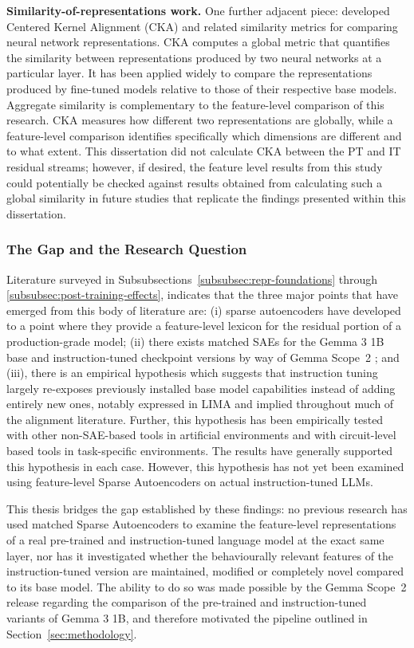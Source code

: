 \textbf{Similarity-of-representations work.} One further adjacent piece:\textcite{kornblith_similarity_2019} developed Centered Kernel Alignment (CKA) and related similarity metrics for comparing neural network representations. CKA computes a global metric that quantifies the similarity between representations produced by two neural networks at a particular layer. It has been applied widely to compare the representations produced by fine-tuned models relative to those of their respective base models. Aggregate similarity is complementary to the feature-level comparison of this research. CKA measures how different two representations are globally, while a feature-level comparison identifies specifically which dimensions are different and to what extent. This dissertation did not calculate CKA between the PT and IT residual streams; however, if desired, the feature level results from this study could potentially be checked against results obtained from calculating such a global similarity in future studies that replicate the findings presented within this dissertation.

\subsubsection{The Gap and the Research Question}
\label{subsubsec:gap-rq}

Literature surveyed in Subsubsections~\ref{subsubsec:repr-foundations} through \ref{subsubsec:post-training-effects}, indicates that the three major points that have emerged from this body of literature are: (i) sparse autoencoders have developed to a point where they provide a feature-level lexicon for the residual portion of a production-grade model; (ii) there exists matched SAEs for the Gemma 3 1B base and instruction-tuned checkpoint versions by way of Gemma Scope~2 \parencite{mcdougall_gemma_scope_2_2025}; and (iii), there is an empirical hypothesis which suggests that instruction tuning largely re-exposes previously installed base model capabilities instead of adding entirely new ones, notably expressed in LIMA and implied throughout much of the alignment literature. Further, this hypothesis has been empirically tested with other non-SAE-based tools in artificial environments and with circuit-level based tools in task-specific environments. The results have generally supported this hypothesis in each case. However, this hypothesis has not yet been examined using feature-level Sparse Autoencoders on actual instruction-tuned LLMs.

This thesis bridges the gap established by these findings: no previous research has used matched Sparse Autoencoders to examine the feature-level representations of a real pre-trained and instruction-tuned language model at the exact same layer, nor has it investigated whether the behaviourally relevant features of the instruction-tuned version are maintained, modified or completely novel compared to its base model. The ability to do so was made possible by the Gemma Scope~2 release \parencite{mcdougall_gemma_scope_2_2025} regarding the comparison of the pre-trained and instruction-tuned variants of Gemma 3 1B, and therefore motivated the pipeline outlined in Section~\ref{sec:methodology}.

